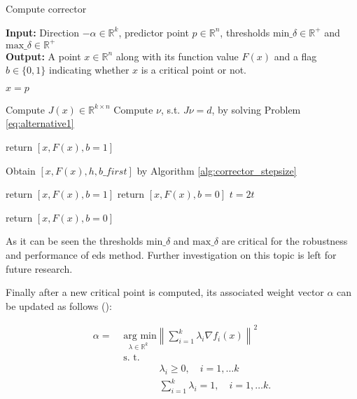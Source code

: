 \begin{algorithm}[H]
\caption{Compute corrector}\label{alg:corrector}
\textbf{Input:} Direction $-\alpha \in \mathbb{R}^k$, predictor point $p \in \mathbb{R}^n$, thresholds $\text{min\_}\delta \in \mathbb{R}^+$ and $\text{max\_}\delta \in \mathbb{R}^+$\\
\textbf{Output:} A point $x \in \mathbb{R}^n$ along with its function value $F(x)$ and a flag $b \in \{0,1\}$ indicating whether $x$ is a critical point or not.
	\begin{algorithmic}[1]
		\State $x = p$
		

			\State Compute $J(x) \in \mathbb{R}^{k \times n}$
			\State Compute $\nu$, s.t. $J \nu = d$, by solving Problem \eqref{eq:alternative1}		
		
				\State return $[x, F(x),  b = 1]$
			\EndIf
		
			\State Obtain $[x, F(x), h, b\_first]$ by Algorithm \ref{alg:corrector_stepsize} 
		
					\State return $[x, F(x), b = 1]$
				\Else	
					\State return $[x, F(x), b = 0]$
				\EndIf
			\Else
					$t = 2t$					
				\EndIf	
		
			\EndIf
		
		\EndWhile
		
		\State return $[x, F(x), b = 0]$
	\end{algorithmic}
\end{algorithm}

As it can be seen the thresholds $\text{min\_}\delta$ and $\text{max\_}\delta$ are critical for the robustness and performance of \gls{eds} method. Further investigation on this topic is left for future research.

Finally after a new critical point is computed, its associated weight vector $\alpha$ can be updated as follows (\cite{alpha_update}):

\begin{equation}
\begin{aligned}
	\alpha = &\underset{\lambda \in \mathbb{R}^k}{\text{ arg min}} \left\| \sum_{i = 1}^k \lambda_i \nabla f_i(x) \right\|^2 \\ 
	& \text{ s. t. }\\ 
	& \qquad \qquad \lambda_i \geq 0, \quad i = 1, \ldots k \\
	& \qquad \qquad \sum_{i = 1}^k \lambda_i = 1, \quad i = 1, \ldots k.
\end{aligned}
\end{equation}

